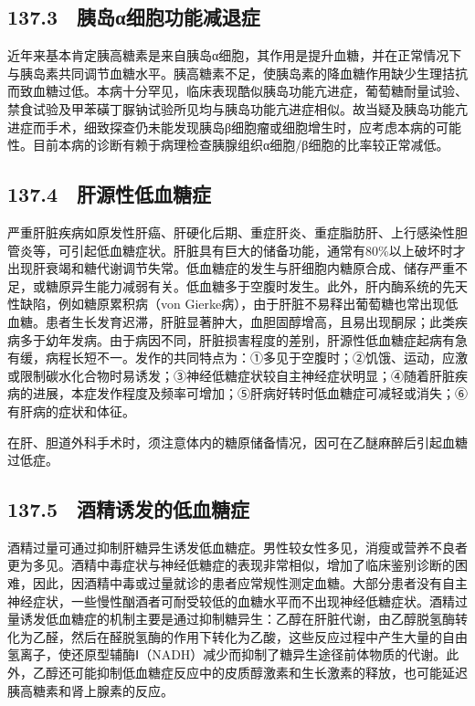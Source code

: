 \subsection{137.3　胰岛α细胞功能减退症}

近年来基本肯定胰高糖素是来自胰岛α细胞，其作用是提升血糖，并在正常情况下与胰岛素共同调节血糖水平。胰高糖素不足，使胰岛素的降血糖作用缺少生理拮抗而致血糖过低。本病十分罕见，临床表现酷似胰岛功能亢进症，葡萄糖耐量试验、禁食试验及甲苯磺丁脲钠试验所见均与胰岛功能亢进症相似。故当疑及胰岛功能亢进症而手术，细致探查仍未能发现胰岛β细胞瘤或细胞增生时，应考虑本病的可能性。目前本病的诊断有赖于病理检查胰腺组织α细胞/β细胞的比率较正常减低。

\subsection{137.4　肝源性低血糖症}

严重肝脏疾病如原发性肝癌、肝硬化后期、重症肝炎、重症脂肪肝、上行感染性胆管炎等，可引起低血糖症状。肝脏具有巨大的储备功能，通常有80\%以上破坏时才出现肝衰竭和糖代谢调节失常。低血糖症的发生与肝细胞内糖原合成、储存严重不足，或糖原异生能力减弱有关。低血糖多于空腹时发生。此外，肝内酶系统的先天性缺陷，例如糖原累积病（von
Gierke病），由于肝脏不易释出葡萄糖也常出现低血糖。患者生长发育迟滞，肝脏显著肿大，血胆固醇增高，且易出现酮尿；此类疾病多于幼年发病。由于病因不同，肝脏损害程度的差别，肝源性低血糖症起病有急有缓，病程长短不一。发作的共同特点为：①多见于空腹时；②饥饿、运动，应激或限制碳水化合物时易诱发；③神经低糖症状较自主神经症状明显；④随着肝脏疾病的进展，本症发作程度及频率可增加；⑤肝病好转时低血糖症可减轻或消失；⑥有肝病的症状和体征。

在肝、胆道外科手术时，须注意体内的糖原储备情况，因可在乙醚麻醉后引起血糖过低症。

\subsection{137.5　酒精诱发的低血糖症}

酒精过量可通过抑制肝糖异生诱发低血糖症。男性较女性多见，消瘦或营养不良者更为多见。酒精中毒症状与神经低糖症的表现非常相似，增加了临床鉴别诊断的困难，因此，因酒精中毒或过量就诊的患者应常规性测定血糖。大部分患者没有自主神经症状，一些慢性酗酒者可耐受较低的血糖水平而不出现神经低糖症状。酒精过量诱发低血糖症的机制主要是通过抑制糖异生：乙醇在肝脏代谢，由乙醇脱氢酶转化为乙醛，然后在醛脱氢酶的作用下转化为乙酸，这些反应过程中产生大量的自由氢离子，使还原型辅酶Ⅰ（NADH）减少而抑制了糖异生途径前体物质的代谢。此外，乙醇还可能抑制低血糖症反应中的皮质醇激素和生长激素的释放，也可能延迟胰高糖素和肾上腺素的反应。

